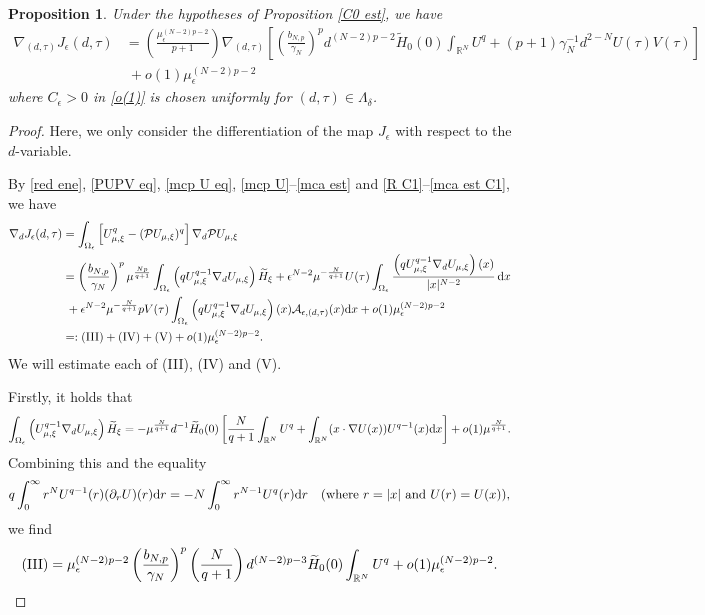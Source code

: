 \documentclass[reqno]{amsart}
\newtheorem{proposition}[theorem]{Proposition}
\theoremstyle{remark}
\newcommand{\pa}{\partial}
\newcommand{\ep}{\epsilon}
\newcommand{\ga}{\gamma}
\newcommand{\R}{\mathbb{R}}
\newcommand{\mca}{\mathcal{A}}
\newcommand{\mcp}{\mathcal{P}}
\newcommand{\wth}{\widetilde{H}}
\newcommand{\dx}{\textup{d}x}
\newcommand{\mx}{{\mu,\xi}}
\renewcommand{\(}{\left(}
\renewcommand{\)}{\right)}
\numberwithin{equation}{section}
\begin{document}
\begin{proposition}\label{C1 est}
Under the hypotheses of Proposition \ref{C0 est}, we have
\begin{align}
\nabla_{(d,\tau)} J_\ep(d,\tau) &= \(\frac{\mu_\ep^{(N-2)p-2}}{p+1}\) \nabla_{(d,\tau)} \left[\(\frac{b_{N,p}}{\ga_N}\)^p d^{(N-2)p-2} \wth_0(0)\int_{\R^N}U^q + (p+1)\ga_N^{-1}d^{2-N} U(\tau)V(\tau)\right] \nonumber \\
&\ +o(1)\mu_\ep^{(N-2)p-2} \label{ene exp C1}
\end{align}
where $C_\ep > 0$ in \eqref{o(1)} is chosen uniformly for $(d,\tau)\in \Lambda_\delta$.
\end{proposition}
\begin{proof}
Here, we only consider the differentiation of the map $J_\ep$ with respect to the $d$-variable.

By \eqref{red ene}, \eqref{PUPV eq}, \eqref{mcp U eq}, \eqref{mcp U}--\eqref{mca est} and \eqref{R C1}--\eqref{mca est C1}, we have
\begin{align}
\nabla_d J_\ep(d,\tau) &= \int_{\Omega_\ep} \left[U_\mx^q - (\mcp U_\mx)^q\right]  \nabla_d \mcp U_\mx \nonumber \\
&= \(\frac{b_{N,p}}{\ga_N}\)^p\mu^{\frac{Np}{q+1}} \int_{\Omega_\ep} \(qU_\mx^{q-1} \nabla_d U_\mx\) \wth_\xi
+ \ep^{N-2}\mu^{-\frac{N}{q+1}} U(\tau) \int_{\Omega_\ep} \frac{\(qU_\mx^{q-1}\nabla_d U_\mx\)(x)}{|x|^{N-2}}\, \dx \nonumber \\
&\ + \ep^{N-2}\mu^{-\frac{N}{q+1}} p V(\tau) \int_{\Omega_\ep} \(qU_\mx^{q-1}\nabla_d U_\mx\)(x)\mca_{\ep,(d,\tau)}(x) \dx + o(1)\mu_\ep^{(N-2)p-2} \label{ene C1 est1} \\
&=: \textup{(III)} + \textup{(IV)} + \textup{(V)} + o(1)\mu_\ep^{(N-2)p-2}. \nonumber
\end{align}
We will estimate each of (III), (IV) and (V).

Firstly, it holds that
\[\int_{\Omega_\ep} \(U_\mx^{q-1} \nabla_d U_\mx\) \wth_\xi = - \mu^{N \over q+1} d^{-1} \wth_0(0) \left[\frac{N}{q+1} \int_{\R^N} U^q + \int_{\R^N} (x \cdot \nabla U(x)) U^{q-1}(x) \dx\right] + o(1)\mu^{N \over q+1}.\]
Combining this and the equality
\[q\int_0^{\infty} r^N U^{q-1}(r) (\pa_rU)(r) \textup{d}r = -N\int_0^{\infty}r^{N-1}U^q(r) \textup{d}r \quad (\text{where } r = |x| \text{ and } U(r) = U(x)),\]
we find
\begin{equation}\label{ene C1 est2}
\textup{(III)} = \mu_\ep^{(N-2)p-2} \(\frac{b_{N,p}}{\ga_N}\)^p \(\frac{N}{q+1}\) d^{(N-2)p-3} \wth_0(0) \int_{\R^N}U^q + o(1)\mu_\ep^{(N-2)p-2}.
\end{equation}


\end{proof}
\end{document}
